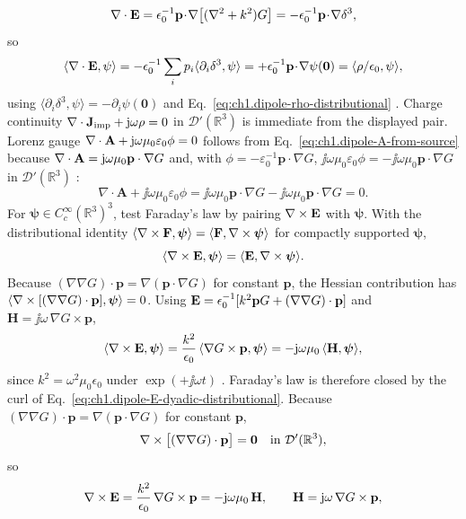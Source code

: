 \[
\nabla\cdot\mathbf{E}=\epsilon_0^{-1}\mathbf{p}\!\cdot\!\nabla\big[(\nabla^2+k^2)G\big]
=-\epsilon_0^{-1}\mathbf{p}\!\cdot\!\nabla\delta^{3},
\]
so
\[
\langle\nabla\cdot\mathbf{E},\psi\rangle
=-\epsilon_0^{-1}\sum_i p_i\langle\partial_i\delta^{3},\psi\rangle
=+\epsilon_0^{-1}\mathbf{p}\!\cdot\!\nabla\psi(\mathbf{0})
=\langle\rho/\epsilon_0,\psi\rangle,
\]
using $\langle\partial_i\delta^{3},\psi\rangle=-\partial_i\psi(\mathbf{0})$ and Eq.~\eqref{eq:ch1.dipole-rho-distributional} \cite{jackson1999,stratton1941}. Charge continuity $\nabla\cdot\mathbf{J}_{\mathrm{imp}}+\mathrm{j}\omega\rho=0$ in $\mathcal{D}'(\mathbb{R}^{3})$ is immediate from the displayed pair. Lorenz gauge $\nabla\cdot\mathbf{A}+\mathrm{j}\omega\mu_0\varepsilon_0\phi=0$ follows from Eq.~\eqref{eq:ch1.dipole-A-from-source} because $\nabla\cdot\mathbf{A}=\mathrm{j}\omega\mu_0\mathbf{p}\cdot\nabla G$ and, with $\phi=-\varepsilon_0^{-1}\mathbf{p}\cdot\nabla G$, $\jj\omega\mu_0\varepsilon_0\phi=-\jj\omega\mu_0\mathbf{p}\cdot\nabla G$ in $\mathcal{D}'(\mathbb{R}^{3})$ \cite{jackson1999,stratton1941}:
\begin{equation}
\label{eq:ch1.dipole-lorenz-gauge}
\nabla\cdot\mathbf{A}+\jj\omega\mu_0\varepsilon_0\phi
=\jj\omega\mu_0\mathbf{p}\cdot\nabla G
-\jj\omega\mu_0\mathbf{p}\cdot\nabla G=0.
\end{equation}
For $\boldsymbol\psi\in C_c^\infty(\mathbb{R}^{3})^{3}$, test Faraday's law by pairing $\nabla\times\mathbf{E}$ with $\boldsymbol\psi$. With the distributional identity $\langle\nabla\times\mathbf F,\boldsymbol\psi\rangle=\langle\mathbf F,\nabla\times\boldsymbol\psi\rangle$ for compactly supported $\boldsymbol\psi$,
\[
\langle\nabla\times\mathbf{E},\boldsymbol\psi\rangle
=\langle\mathbf{E},\nabla\times\boldsymbol\psi\rangle.
\]
Because $(\nabla\nabla G)\cdot\mathbf{p}=\nabla(\mathbf{p}\cdot\nabla G)$ for constant $\mathbf{p}$, the Hessian contribution has $\langle\nabla\times[(\nabla\nabla G)\cdot\mathbf{p}],\boldsymbol\psi\rangle=0$. Using $\mathbf{E}=\epsilon_0^{-1}[k^{2}\mathbf{p}G+(\nabla\nabla G)\cdot\mathbf{p}]$ and $\mathbf{H}=\jj\omega\,\nabla G\times\mathbf{p}$,
\[
\langle\nabla\times\mathbf{E},\boldsymbol\psi\rangle
=\frac{k^{2}}{\epsilon_0}\,\langle\nabla G\times\mathbf{p},\boldsymbol\psi\rangle
=-\mathrm{j}\omega\mu_0\,\langle\mathbf{H},\boldsymbol\psi\rangle,
\]
since $k^{2}=\omega^{2}\mu_0\epsilon_0$ under $\exp(+\jj\omega t)$ \cite{jackson1999,stratton1941}. Faraday's law is therefore closed by the curl of Eq.~\eqref{eq:ch1.dipole-E-dyadic-distributional}. Because $(\nabla\nabla G)\cdot\mathbf{p}=\nabla(\mathbf{p}\cdot\nabla G)$ for constant $\mathbf{p}$,
\[
\nabla\times\bigl[(\nabla\nabla G)\cdot\mathbf{p}\bigr]=\mathbf{0}
\quad\text{in }\mathcal{D}'(\mathbb{R}^{3}),
\]
so
\begin{equation}
\label{eq:ch1.dipole-faraday-distributional}
\nabla\times\mathbf{E}
=\frac{k^{2}}{\epsilon_0}\,\nabla G\times\mathbf{p}
=-\mathrm{j}\omega\mu_0\,\mathbf{H},
\qquad
\mathbf{H}=\mathrm{j}\omega\,\nabla G\times\mathbf{p},
\end{equation}
